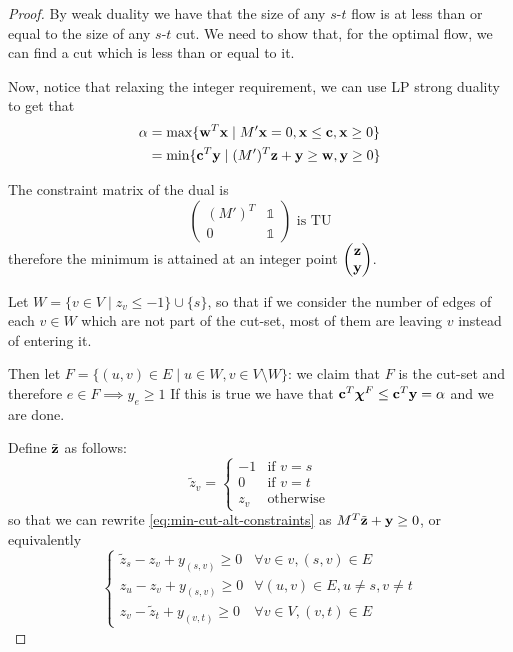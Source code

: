 \documentclass[12pt]{extarticle}
\renewcommand{\vec}[1]{\bvec{#1}}
\begin{document}
\begin{proof}
	By weak duality we have that the size of any $s$-$t$ flow is at less than or equal to the size of
	any $s$-$t$ cut.
	We need to show that, for the optimal flow, we can find a cut which is less than or equal to it.

	Now, notice that relaxing the integer requirement, we can use LP strong duality to get that
	\begin{align}
		\alpha & = \max \{ \vec w^T \vec x \mid M'\vec x = 0, \vec x \leq \vec c, \vec x \geq 0 \}   \\
		       & = \min \{ \vec c^T \vec y \mid (M')^T \vec z + \vec y \geq \vec w, \vec y \geq 0 \}
	\end{align}

	The constraint matrix of the dual is
	\begin{equation}
		\begin{pmatrix}
			(M')^T & \mathds 1 \\
			0      & \mathds 1
		\end{pmatrix} \text{ is TU}
	\end{equation}
	therefore the minimum is attained at an integer point
	$\begin{pmatrix}\vec z \\ \vec y \end{pmatrix}$.

	Let $W = \{ v \in V \mid z_v \leq -1 \} \cup \{s\}$, so that if we consider the number of edges of
	each $v \in W$ which are not part of the cut-set, most of them are leaving $v$ instead of entering
	it.

	Then let $F = \{(u, v) \in E \mid u \in W, v\in V \setminus W \}$: we claim that $F$ is the
	cut-set and therefore $e \in F \implies y_e \geq 1$
	If this is true we have that $\vec c^T \vec \chi^F \leq \vec c^T \vec y = \alpha$ and we are done.

	Define $\tilde{\vec z}$ as follows:
	\begin{equation}
		\tilde z_v = \begin{cases}
			-1  & \text{if } v = s \\
			0   & \text{if } v = t \\
			z_v & \text{otherwise}
		\end{cases}
	\end{equation}
	so that we can rewrite \cref{eq:min-cut-alt-constraints} as $M^T \tilde{\vec z} + \vec y \geq 0$,
	or equivalently
	\begin{equation}
		\begin{cases}
			\tilde z_s -z_v + y_{(s, v)} \geq 0  & \forall v \in v, (s, v) \in E            \\
			z_u - z_v + y_{(s, v)} \geq 0        & \forall (u, v) \in E, u \neq s, v \neq t \\
			z_v - \tilde z_t + y_{(v, t)} \geq 0 & \forall v \in V, (v, t) \in E
		\end{cases}
		\label{eq:min-cut-alt-constraints-tilde}
	\end{equation}


\end{proof}
\end{document}
